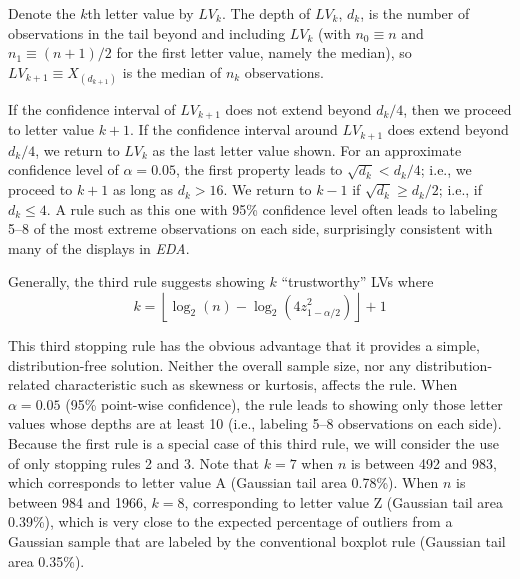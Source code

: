 \documentclass[oneside]{article}
\begin{document}
Denote the $k$th letter value by $LV_k$. The depth of $LV_k$, $d_k$, is the number of observations in the tail beyond and including $LV_{k}$ (with $n_0 \equiv n$ and $n_1 \equiv (n+1)/2$ for the first letter value, namely the median), so $LV_{k+1} \equiv X_{(d_{k+1})}$ is the median of $n_k$ observations.


If the confidence interval of $LV_{k+1}$ does not extend beyond $d_k/4$, then we proceed to letter value $k+1$. If the confidence interval around $LV_{k+1}$ does extend beyond $d_k/4$, we return to $LV_{k}$ as the last letter value shown. For an approximate confidence level of $\alpha= 0.05$, the first property leads to $\sqrt{d_k} < d_k/4$; i.e., we proceed to $k+1$ as long as $d_k > 16$. We return to $k-1$ if $\sqrt{d_k} \ge d_k/2$; i.e., if $d_k \le 4$. A rule such as this one with 95\% confidence level often leads to labeling 5--8 of the most extreme observations on each side, surprisingly consistent with many of the displays in \textit{EDA}.

Generally, the third rule suggests showing $k$  ``trustworthy'' LVs where
\begin{equation}
k =  \left \lfloor \log_2 (n) - \log_2 
   \left(4  z_{1-\alpha/2}^2 \right) \right \rfloor + 1
\end{equation}

\noindent This third stopping rule has the obvious advantage that it provides a simple, distribution-free solution. Neither the overall sample size, nor any distribution-related characteristic such as skewness or kurtosis, affects the rule. When $\alpha = 0.05$ (95\% point-wise confidence), the rule leads to showing only those letter values whose depths are at least 10 (i.e., labeling 5--8 observations on each side). Because the first rule is a special case of this third rule, we will consider the use of only stopping rules 2 and 3. Note that $k = 7$ when $n$ is between 492 and 983, which corresponds to letter value A (Gaussian tail area 0.78\%). When $n$ is between 984 and 1966, $k = 8$, corresponding to letter value Z (Gaussian tail area 0.39\%), which is very close to the expected percentage of outliers from a Gaussian sample that are labeled by the conventional boxplot rule (Gaussian tail area 0.35\%).
\end{document}
